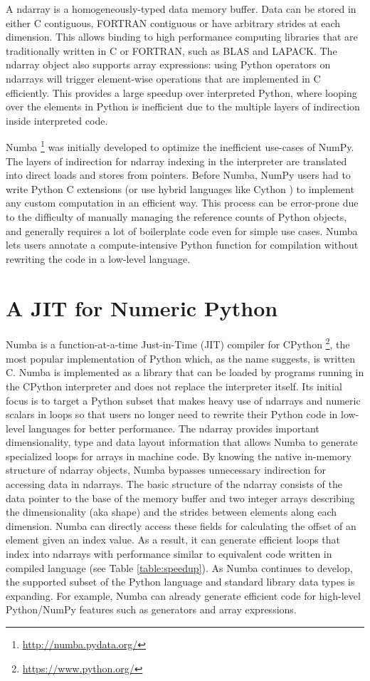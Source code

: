 \documentclass{acm_proc_article-sp}
\begin{document}
A ndarray is a homogeneously-typed data memory buffer.  Data can be
stored in either C contiguous, FORTRAN contiguous or have arbitrary
strides at each dimension.  This allows binding to high performance
computing libraries that are traditionally written in C or FORTRAN,
such as BLAS and LAPACK. The ndarray object also supports array
expressions: using Python operators on ndarrays will trigger
element-wise operations that are implemented in C efficiently.  This
provides a large speedup over interpreted Python, where looping over
the elements in Python is inefficient due to the multiple layers of
indirection inside interpreted code.

Numba \footnote{\url{http://numba.pydata.org/}} was initially
developed to optimize the inefficient use-cases of NumPy.  The layers
of indirection for ndarray indexing in the interpreter are translated
into direct loads and stores from pointers.  Before Numba, NumPy users
had to write Python C extensions (or use hybrid languages like Cython
\cite{behnel:cython}) to implement any custom computation in an
efficient way.  This process can be error-prone due to the difficulty
of manually managing the reference counts of Python objects, and
generally requires a lot of boilerplate code even for simple use
cases.  Numba lets users annotate a compute-intensive Python function
for compilation without rewriting the code in a low-level language.

\section{A JIT for Numeric Python}

Numba is a function-at-a-time Just-in-Time (JIT) compiler for CPython
\footnote{\url{https://www.python.org/}}, the most popular
implementation of Python which, as the name suggests, is written C.
Numba is implemented as a library that can be loaded by programs
running in the CPython interpreter and does not replace the interpreter
itself.  Its initial focus is to target a Python subset that makes
heavy use of ndarrays and numeric scalars in loops so that users no
longer need to rewrite their Python code in low-level languages for
better performance.  The ndarray provides important dimensionality,
type and data layout information that allows Numba to generate
specialized loops for arrays in machine code.  By knowing the native
in-memory structure of ndarray objects, Numba bypasses unnecessary
indirection for accessing data in ndarrays.  The basic structure of
the ndarray consists of the data pointer to the base of the memory
buffer and two integer arrays describing the dimensionality (aka
shape) and the strides between elements along each dimension. Numba
can directly access these fields for calculating the offset of an
element given an index value.  As a result, it can generate efficient
loops that index into ndarrays with performance similar to equivalent
code written in compiled language (see Table \ref{table:speedup}). As
Numba continues to develop, the supported subset of the Python
language and standard library data types is expanding.  For example,
Numba can already generate efficient code for high-level Python/NumPy
features such as generators and array expressions.
\end{document}
